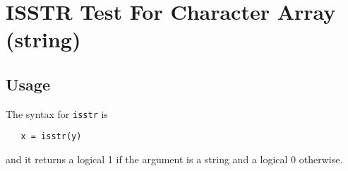 \section{ISSTR Test For Character Array (string)}

\subsection{Usage}

The syntax for \verb|isstr| is 
\begin{verbatim}
   x = isstr(y)
\end{verbatim}
and it returns a logical 1 if the argument is a string
and a logical 0 otherwise.
